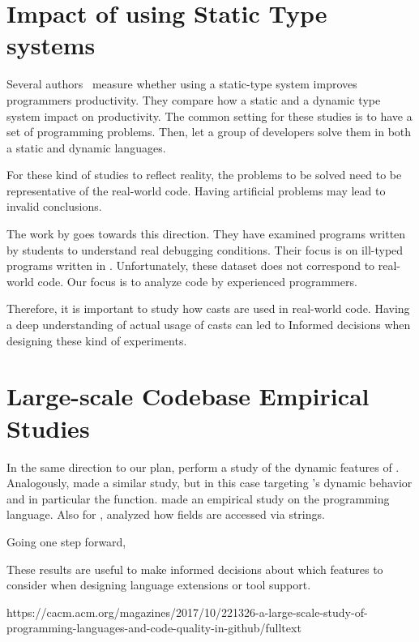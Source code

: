 \section{Impact of using Static Type systems}

Several authors~\cite{stuchlik_static_2011,mayer_empirical_2012,harlin_impact_2017} measure whether using a static-type system improves programmers productivity.
They compare how a static and a dynamic type system impact on productivity.
The common setting for these studies is to have a set of programming problems.
Then, let a group of developers solve them in both a static and dynamic languages.

For these kind of studies to reflect reality, the problems to be solved need to
be representative of the real-world code.
Having artificial problems may lead to invalid conclusions.

The work by \cite{wu_how_2017,wu_learning_2017} goes towards this direction.
They have examined programs written by students to understand real debugging conditions.
Their focus is on ill-typed programs written in \haskell{}.
Unfortunately, these dataset does not correspond to real-world code.
Our focus is to analyze code by experienced programmers.

Therefore, it is important to study how casts are used in real-world code.
Having a deep understanding of actual usage of casts can led to
Informed decisions when designing these kind of experiments.

\section{Large-scale Codebase Empirical Studies}

In the same direction to our plan, \cite{callau_how_2013} perform a study of the dynamic features of \smalltalk{}.
Analogously, \cite{richards_analysis_2010,richards_eval_2011} made a similar study, but in this case targeting \javascript{}'s dynamic behavior and in particular the \eval{} function.
\cite{reboucas_empirical_2016} made an empirical study on the \swift{} programming language.
Also for \javascript{}, \cite{madsen_string_2014} analyzed how fields are accessed via strings.

Going one step forward, \cite{ray_large-scale_2017} 

These results are useful to make informed decisions about which features to consider when designing language extensions or tool support.

https://cacm.acm.org/magazines/2017/10/221326-a-large-scale-study-of-programming-languages-and-code-quality-in-github/fulltext



